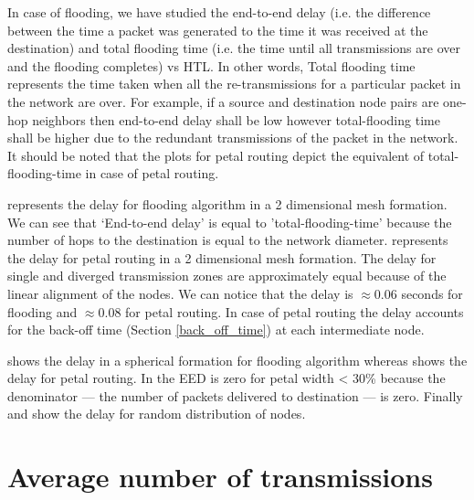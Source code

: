 In case of flooding, we have studied the end-to-end delay (i.e. the difference between the time a packet was generated to the time it was received at the destination) and total flooding time (i.e. the time until all transmissions are over and the flooding completes) vs HTL. In other words, Total flooding time represents the time taken when all the re-transmissions for a particular packet in the network are over. For example, if a source and destination node pairs are one-hop neighbors then end-to-end delay shall be low however total-flooding time shall be higher due to the redundant transmissions of the packet in the network. It should be noted that the plots for petal routing depict the equivalent of total-flooding-time in case of petal routing.  

 represents the delay for flooding algorithm in a 2 dimensional mesh formation. We can see that `End-to-end delay' is equal to 'total-flooding-time' because the number of hops to the destination is equal to the network diameter.  represents the delay for petal routing in a 2 dimensional mesh formation. The delay for single and diverged transmission zones are approximately equal because of the linear alignment of the nodes. We can notice that the delay is $\approx 0.06$ seconds for flooding and $\approx 0.08$ for petal routing. In case of petal routing the delay accounts for the back-off time (Section \ref{back_off_time}) at each intermediate node.

 shows the delay in a spherical formation for flooding algorithm whereas  shows the delay for petal routing. In  the EED is zero for petal width < 30\% because the denominator --- the number of packets delivered to destination --- is zero. 
Finally  and  show the delay for random distribution of nodes. 

\section{Average number of transmissions}

